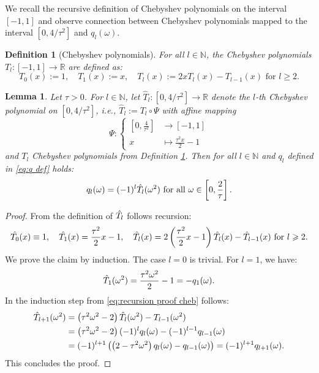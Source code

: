 \documentclass[a4paper,11pt,bibliography=totoc,listof=totoc,headinclude=true,cleardoublepage=empty,oneside]{scrbook}
\newtheorem{definition}[theorem]{Definition}
\newtheorem{lemma}[theorem]{Lemma}
\newcommand{\R}{\mathbb{R}}
\newcommand{\N}{\mathbb{N}}
\begin{document}
We recall the recursive definition of Chebyshev polynomials on the interval $[-1, 1]$ \cite[p. 23]{numericsAB} and observe connection between Chebyshev polynomials mapped to the interval $[0, 4/\tau^2]$ and $q_l(\omega)$.

\begin{definition}[Chebyshev polynomials]\label{def:chebyshev polynomials}
    For all $l\in \N$, the Chebyshev polynomials $T_l: [-1, 1] \rightarrow \R$ are defined as:
    \begin{equation*}
        T_0(x) := 1, \quad T_1(x) := x, \quad T_l(x) := 2xT_l(x) - T_{l-1}(x) \text{ for } l \geqslant 2.
    \end{equation*}
\end{definition}

\begin{lemma}\label{lemma:q chebyshev}
    Let $\tau > 0$. For $l\in \N$, let $\hat{T}_l : [0, 4/\tau^2] \rightarrow \R $ denote the $l$-th Chebyshev polynomial on $[0, 4/\tau^2]$, i.e., $\hat{T}_l := T_l \circ \Psi$ with affine mapping 
    \begin{equation*}
        \Psi: \begin{cases}\left[0, \frac{4}{\tau^2}\right] &\rightarrow [-1, 1]\\ x &\mapsto \frac{\tau^2 x}{2} - 1\end{cases}
    \end{equation*}
    and $T_l$ Chebyshev polynomials from Definition \ref{def:chebyshev polynomials}. Then for all $l\in \N$ and $q_l$ defined in \eqref{eq:q def} holds: 
    \begin{equation*}
        q_l(\omega) = (-1)^l \Hat{T_l}(\omega^2) \text{ for all } \omega \in \left[0, \frac{2}{\tau}\right].
    \end{equation*}
\end{lemma}
\begin{proof}
    From the definition of $\Hat{T_l}$ follows recursion:
    \begin{equation}\label{eq:recursion proof cheb}
        \Hat{T_0}(x) \equiv 1, \quad \Hat{T_1}(x) = \frac{\tau^2}{2}x - 1, \quad \Hat{T_l}(x) = 2\left(\frac{\tau^2}{2}x - 1\right)\Hat{T_l}(x) - \Hat{T}_{l-1}(x) \text{ for } l \geqslant 2.
    \end{equation}
    We prove the claim by induction. The case $l=0$ is trivial. For $l=1$, we have:
    \begin{equation*}
        \Hat{T}_1(\omega^2) = \frac{\tau^2\omega^2}{2} - 1 = -q_1(\omega).
    \end{equation*}
    In the induction step from \eqref{eq:recursion proof cheb} follows:
    \begin{align*}
        \Hat{T}_{l+1}(\omega^2) &= \left(\tau^2 \omega^2 -2\right) \Hat{T}_l(\omega^2) - T_{l-1}(\omega^2) \\ &= \left(\tau^2 \omega^2 -2\right) (-1)^l q_l(\omega) - (-1)^{l-1} q_{l-1}(\omega) \\ &= (-1)^{l+1} \left( \left(2-\tau^2\omega^2\right)q_l(\omega) - q_{l-1}(\omega)\right) = (-1)^{l+1} q_{l+1}(\omega).
    \end{align*}
    This concludes the proof.
\end{proof}
\end{document}
